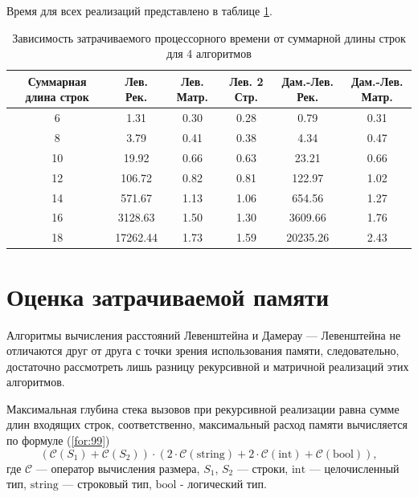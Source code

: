 \documentclass{report}
\begin{document}
Время для всех реализаций представлено в таблице \ref{tb:times}.

\begin{table}[h!p]
	\begin{center}
		\caption{\label{tbl:time_test}Зависимость затрачиваемого процессорного времени от суммарной длины строк для 4 алгоритмов}
		\label{tb:times}
		\begin{tabular}{|c|c|c|c|c|c|}
			\hline
			Суммарная длина строк & Лев. Рек. & Лев. Матр. & Лев. 2 Стр. & Дам.-Лев. Рек. & Дам.-Лев. Матр. \\ 
			\hline
            6 & 1.31 & 0.30 & 0.28 & 0.79 & 0.31 \\ 
            \hline
            8 & 3.79 & 0.41 & 0.38 & 4.34 & 0.47  \\ 
            \hline
            10 & 19.92 & 0.66 & 0.63 & 23.21 & 0.66  \\ 
            \hline
            12 & 106.72 & 0.82 & 0.81 & 122.97 & 1.02  \\ 
            \hline
            14 & 571.67 & 1.13 & 1.06 & 654.56 & 1.27  \\ 
            \hline
            16 & 3128.63 & 1.50 & 1.30 & 3609.66 & 1.76 \\ 
            \hline
            18 & 17262.44 & 1.73 & 1.59 & 20235.26 & 2.43 \\ 
            \hline
		\end{tabular}
	\end{center}
\end{table}

\section{Оценка затрачиваемой памяти}

Алгоритмы вычисления расстояний Левенштейна и Дамерау — Левенштейна не отличаются друг от друга с точки зрения использования памяти, следовательно, достаточно рассмотреть лишь разницу рекурсивной и матричной реализаций этих алгоритмов.

Максимальная глубина стека вызовов при рекурсивной реализации равна сумме длин входящих строк, соответственно, максимальный расход памяти вычисляется по формуле (\ref{for:99})
\begin{equation}
	(\mathcal{C}(S_1) + \mathcal{C}(S_2)) \cdot (2 \cdot \mathcal{C}\mathrm{(string)} + 2 \cdot \mathcal{C}\mathrm{(int)} + \mathcal{C}\mathrm{(bool)}),
	\label{for:99}
\end{equation}
где $\mathcal{C}$ — оператор вычисления размера, $S_1$, $S_2$ — строки, $\mathrm{int}$ — целочисленный тип, $\mathrm{string}$ — строковый тип,  $\mathrm{bool}$ - логический тип.
\end{document}
